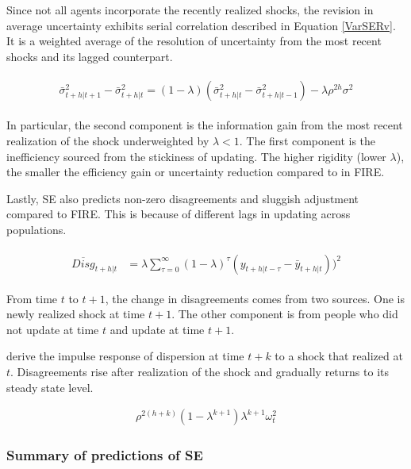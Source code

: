 \documentclass[12pt]{article}
\begin{document}
	
	Since not all agents incorporate the recently realized shocks, the revision in average uncertainty exhibits serial correlation described in Equation \ref{VarSERv}. It is a weighted average of the resolution of uncertainty from the most recent shocks and its lagged counterpart. 
	
	\begin{eqnarray}\label{VarSERv}
		\begin{aligned}
			\bar \sigma^2_{t+h|t+1} - \bar \sigma^2_{t+h|t} = (1-\lambda)(
			\bar \sigma^2_{t+h|t} - \bar \sigma^2_{t+h|t-1}) -\lambda \rho^{2h} \sigma^2 
		\end{aligned}
	\end{eqnarray}
	
	In particular, the second component is the information gain from the most recent realization of the shock underweighted by $\lambda<1$. The first component is the inefficiency sourced from the stickiness of updating. The higher rigidity (lower $\lambda$), the smaller the efficiency gain or uncertainty reduction compared to in FIRE. 
	
	Lastly, SE also predicts non-zero disagreements and sluggish adjustment compared to FIRE. This is because of different lags in updating across populations. 
	
	\begin{eqnarray}\label{DisgSEPop}
		\begin{aligned}
			\overline{Disg}_{t+h|t} & = \lambda \sum^{\infty}_{\tau=0} (1-\lambda)^{\tau} (y_{t+h|t-\tau} - \bar y_{t+h|t }))^2  
		\end{aligned}
	\end{eqnarray}
	
	From time $t$ to $t+1$, the change in disagreements comes from two sources. One is newly realized shock at time $t+1$. The other component is from people who did not update at time $t$ and update at time $t+1$.  
	
	\citet{coibion2012can} derive the impulse response of dispersion at time $t+k$ to a shock that realized at $t$. Disagreements rise after realization of the shock and gradually returns to its steady state level.  
	
	\begin{eqnarray}
		\rho^{2(h+k)} (1-\lambda^{k+1})\lambda^{k+1} \omega^2_t
	\end{eqnarray}
	
	
	
	\subsubsection{Summary of predictions of SE}
	
\end{document}
